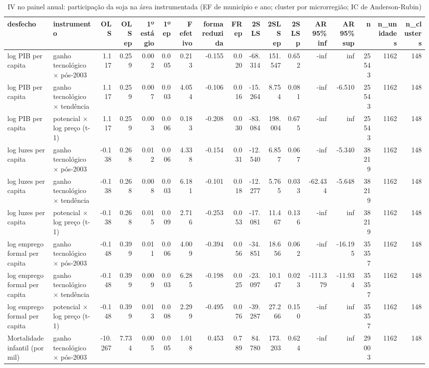 \begin{table}
\caption{IV no painel anual: participação da soja na área instrumentada (EF de município e ano; cluster por microrregião; IC de Anderson-Rubin)}
\label{tab:s08_iv_painel}
\begin{tabular}{llrrrrrrrrrrrrrrr}
\toprule
desfecho & instrumento & OLS & OLS ep & 1º estágio & 1º ep & F efetivo & forma reduzida & FR ep & 2SLS & 2SLS ep & 2SLS p & AR 95\% inf & AR 95\% sup & n & n\_unidades & n\_clusters \\
\midrule
log PIB per capita & ganho tecnológico × pós-2003 & 1.117 & 0.259 & 0.002 & 0.005 & 0.213 & -0.155 & 0.020 & -68.314 & 151.547 & 0.652 & -inf & inf & 25543 & 1162 & 148 \\
log PIB per capita & ganho tecnológico × tendência & 1.117 & 0.259 & 0.007 & 0.003 & 4.054 & -0.106 & 0.016 & -15.264 & 8.754 & 0.081 & -inf & -6.510 & 25543 & 1162 & 148 \\
log PIB per capita & potencial × log preço (t-1) & 1.117 & 0.259 & 0.003 & 0.006 & 0.183 & -0.208 & 0.030 & -83.084 & 198.004 & 0.675 & -inf & inf & 25543 & 1162 & 148 \\
log luzes per capita & ganho tecnológico × pós-2003 & -0.138 & 0.268 & 0.012 & 0.006 & 4.338 & -0.154 & 0.031 & -12.540 & 6.857 & 0.067 & -inf & -5.340 & 38219 & 1162 & 148 \\
log luzes per capita & ganho tecnológico × tendência & -0.138 & 0.268 & 0.008 & 0.003 & 6.181 & -0.101 & 0.018 & -12.277 & 5.765 & 0.033 & -62.434 & -5.648 & 38219 & 1162 & 148 \\
log luzes per capita & potencial × log preço (t-1) & -0.138 & 0.268 & 0.015 & 0.009 & 2.716 & -0.253 & 0.053 & -17.081 & 11.467 & 0.136 & -inf & inf & 38219 & 1162 & 148 \\
log emprego formal per capita & ganho tecnológico × pós-2003 & -0.148 & 0.399 & 0.011 & 0.006 & 4.009 & -0.394 & 0.056 & -34.851 & 18.656 & 0.062 & -inf & -16.195 & 35357 & 1162 & 148 \\
log emprego formal per capita & ganho tecnológico × tendência & -0.148 & 0.399 & 0.009 & 0.003 & 6.285 & -0.198 & 0.025 & -23.097 & 10.147 & 0.023 & -111.379 & -11.934 & 35357 & 1162 & 148 \\
log emprego formal per capita & potencial × log preço (t-1) & -0.148 & 0.399 & 0.013 & 0.008 & 2.299 & -0.495 & 0.076 & -39.287 & 27.266 & 0.150 & -inf & inf & 35357 & 1162 & 148 \\
Mortalidade infantil (por mil) & ganho tecnológico × pós-2003 & -10.267 & 7.734 & 0.005 & 0.005 & 1.018 & 0.453 & 0.789 & 84.780 & 173.203 & 0.624 & -inf & inf & 29003 & 1162 & 148 \\

\end{tabular}
\end{table}
